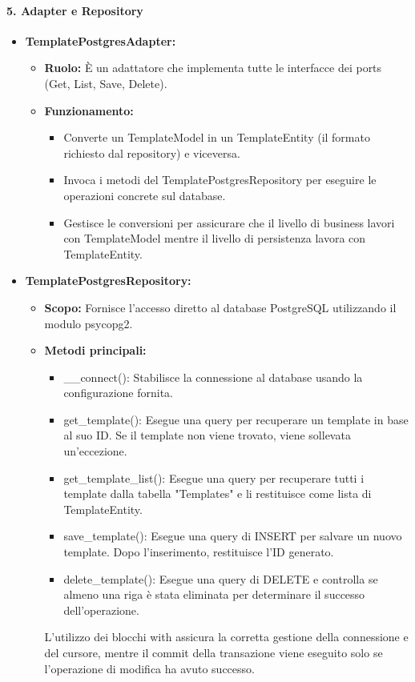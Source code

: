     \paragraph{5. Adapter e Repository}
    \begin{itemize}
        \item \textbf{TemplatePostgresAdapter:}
        \begin{itemize}
            \item \textbf{Ruolo:} È un adattatore che implementa tutte le interfacce dei ports (Get, List, Save, Delete).
            \item \textbf{Funzionamento:}
            \begin{itemize}
                \item Converte un TemplateModel in un TemplateEntity (il formato richiesto dal repository) e viceversa.
                \item Invoca i metodi del TemplatePostgresRepository per eseguire le operazioni concrete sul database.
                \item Gestisce le conversioni per assicurare che il livello di business lavori con TemplateModel mentre il livello di persistenza lavora con TemplateEntity.
            \end{itemize}
        \end{itemize}
        \item \textbf{TemplatePostgresRepository:}
        \begin{itemize}
            \item \textbf{Scopo:} Fornisce l’accesso diretto al database PostgreSQL utilizzando il modulo psycopg2.
            \item \textbf{Metodi principali:}
            \begin{itemize}
                \item \_\_connect(): Stabilisce la connessione al database usando la configurazione fornita.
                \item get\_template(): Esegue una query per recuperare un template in base al suo ID. Se il template non viene trovato, viene sollevata un’eccezione.
                \item get\_template\_list(): Esegue una query per recuperare tutti i template dalla tabella "Templates" e li restituisce come lista di TemplateEntity.
                \item save\_template(): Esegue una query di INSERT per salvare un nuovo template. Dopo l’inserimento, restituisce l’ID generato.
                \item delete\_template(): Esegue una query di DELETE e controlla se almeno una riga è stata eliminata per determinare il successo dell’operazione.
            \end{itemize}
            L’utilizzo dei blocchi with assicura la corretta gestione della connessione e del cursore, mentre il commit della transazione viene eseguito solo se l’operazione di modifica ha avuto successo.
        \end{itemize}
    \end{itemize}
    
